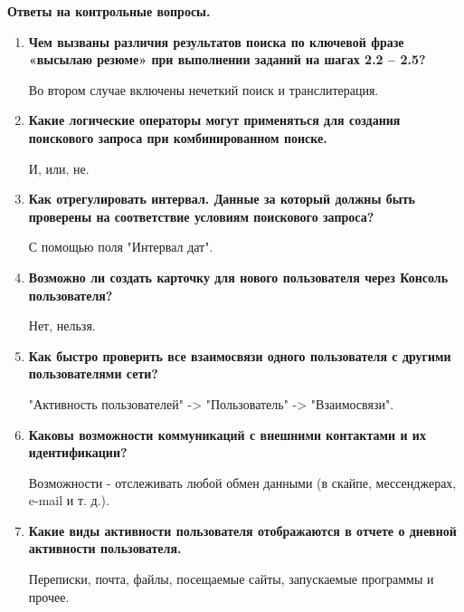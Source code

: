 \documentclass[a4paper,14pt]{extarticle}
\begin{document}
    \textbf{Ответы на контрольные вопросы.}
    \begin{enumerate}
        \item \textbf{ Чем вызваны различия результатов поиска по ключевой фразе «высылаю
        резюме» при выполнении заданий на шагах 2.2 – 2.5? }

        \qquad Во втором случае включены нечеткий поиск и транслитерация.
        \item \textbf{Какие логические операторы могут применяться для создания поискового
        запроса при комбинированном поиске.}
        
        \qquad И, или, не.
        \item \textbf{ Как отрегулировать интервал. Данные за который должны быть проверены
        на соответствие условиям поискового запроса? }
       
        \qquad  С помощью поля "Интервал дат".
        \item \textbf{Возможно ли создать карточку для нового пользователя через Консоль
        пользователя?}
        
        \qquad  Нет, нельзя.
        \item \textbf{Как быстро проверить все взаимосвязи одного пользователя с другими
        пользователями сети?}
        
        \qquad  "Активность пользователей" -> "Пользователь" -> "Взаимосвязи". 
        \item \textbf{Каковы возможности коммуникаций с внешними контактами и их идентификации?}
        
        \qquad Возможности - отслеживать любой обмен данными (в скайпе, мессенджерах, e-mail и т. д.).
        \item \textbf{ Какие виды активности пользователя отображаются в отчете о дневной
        активности пользователя.}

        \qquad  Переписки, почта, файлы, посещаемые сайты, запускаемые программы и прочее.
   \end{enumerate}
    
\end{document}
